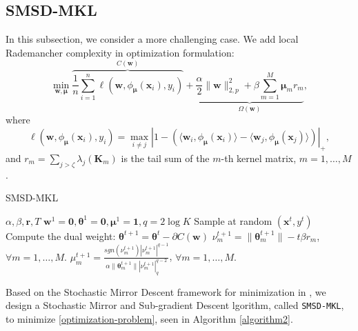 \documentclass{article}
\begin{document}
\subsection{SMSD-MKL}
In this subsection, we consider a more challenging case.
We add local Rademancher complexity in optimization formulation:
\begin{equation}
\label{optimization-problem}
    \min_{\mathbf w,\bm \mu}
    \overbrace{\frac{1}{n}\sum_{i=1}^n\ell(\mathbf w,\phi_{\bm \mu}(\mathbf{x}_i), y_i)}^{C(\mathbf w)}
    +\underbrace{\frac{\alpha}{2}\|\mathbf w\|_{2,p}^2
    +\beta\sum_{m=1}^M\mathbf{\mu}_mr_m}_{\Omega(\mathbf w)},
\end{equation}
where
$$\ell(\mathbf w,\phi_{\bm \mu}(\mathbf{x}_i), y_i)=
\max\limits_{i \not= j}\left|1-\left(\langle\mathbf w_i,
\phi_{\bm \mu}(\mathbf{x}_i)\rangle -\langle\mathbf w_j, \phi_{\bm \mu}(\mathbf{x}_j)\rangle\right)\right|_+,$$
and
$r_m=\sum_{j>\zeta}\lambda_j(\mathbf{K}_m)$ is the tail sum of the $m$-th kernel matrix,  $m=1,\ldots, M$.

\begin{algorithm}[t]
   \caption{SMSD-MKL}
   \label{algorithm2}
    \begin{algorithmic}
        $\alpha, \beta, \bm r, T$
        $\mathbf w^1=\mathbf{0}, \pmb{\theta}^1=\mathbf{0}, \bm \mu^1=\mathbf{1}, q=2\log K $
       \STATE Sample at random $(\mathbf{x}^t, y^t)$
       \STATE Compute the dual weight: $\pmb{\theta}^{t+1}=\pmb{\theta}^t-\partial{C(\mathbf w)}$
       \STATE $\nu_m^{t+1}=\|\bm \theta_m^{t+1}\|-t\beta r_m$, $\forall m=1,\ldots, M.$
       \STATE $\mu_m^{t+1}=\frac{sgn(\nu_m^{t+1})|\nu_m^{t+1}|^{q-1}}
       {\alpha\|\bm \theta_m^{t+1}\||\nu_m^{t+1}|_q^{q-2}}$, $\forall m=1,\ldots, M.$
       \ENDFOR
    \end{algorithmic}
\end{algorithm}

Based on the Stochastic Mirror Descent framework for minimization in \cite{Shalev-ShwartzT11, OrabonaL11},
we design a Stochastic Mirror and Sub-gradient Descent lgorithm, called \texttt{SMSD-MKL}, to minimize \eqref{optimization-problem},
seen in Algorithm \ref{algorithm2}.
\end{document}
